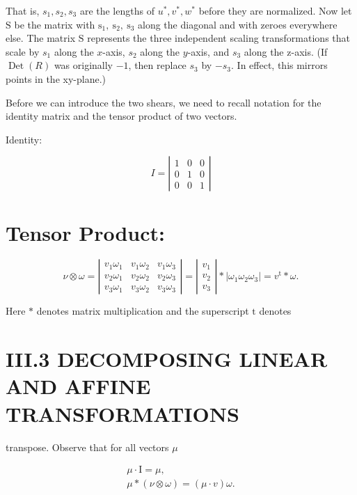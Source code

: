 That is, $s_{1}, s_{2}, s_{3}$ are the lengths of $u^{*}, v^{*}, w^{*}$ before they are normalized. Now let $\mathrm{S}$ be the matrix with $\mathrm{s}_{1}, \mathrm{~s}_{2}, \mathrm{~s}_{3}$ along the diagonal and with zeroes everywhere else. The matrix $\mathrm{S}$ represents the three independent scaling transformations that scale by $s_{1}$ along the $x$-axis, $s_{2}$ along the $y$-axis, and $s_{3}$ along the z-axis. (If $\operatorname{Det}(R)$ was originally $-1$, then replace $s_{3}$ by $-s_{3}$. In effect, this mirrors points in the xy-plane.)

Before we can introduce the two shears, we need to recall notation for the identity matrix and the tensor product of two vectors.

Identity:

$$
I=\left|\begin{array}{lll}
1 & 0 & 0 \\
0 & 1 & 0 \\
0 & 0 & 1
\end{array}\right|
$$

\section{Tensor Product:}
$$
\nu \otimes \omega=\left|\begin{array}{lll}
v_{1} \omega_{1} & v_{1} \omega_{2} & v_{1} \omega_{3} \\
v_{2} \omega_{1} & v_{2} \omega_{2} & v_{2} \omega_{3} \\
v_{3} \omega_{1} & v_{3} \omega_{2} & v_{3} \omega_{3}
\end{array}\right|=\left|\begin{array}{l}
v_{1} \\
v_{2} \\
v_{3}
\end{array}\right| *\left|\omega_{1} \omega_{2} \omega_{3}\right|=v^{\mathrm{t}} * \omega .
$$

Here $*$ denotes matrix multiplication and the superscript $\mathrm{t}$ denotes

\section{III.3 DECOMPOSING LINEAR AND AFFINE TRANSFORMATIONS}
transpose. Observe that for all vectors $\mu$

$$
\begin{gathered}
\mu \cdot \mathrm{I}=\mu, \\
\mu *(\nu \otimes \omega)=(\mu \cdot v) \omega .
\end{gathered}
$$

